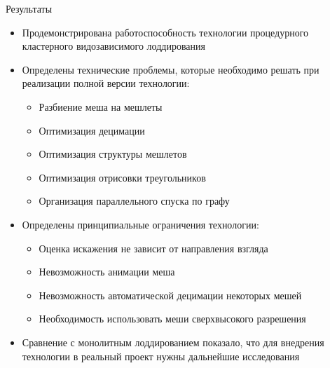 \begin{frame}{Результаты}
    \begin{itemize}
        \item Продемонстрирована работоспособность технологии процедурного кластерного видозависимого лоддирования
        \item Определены технические проблемы, которые необходимо решать при реализации полной версии технологии:
        \begin{itemize}
            \item Разбиение меша на мешлеты
            \item Оптимизация децимации
            \item Оптимизация структуры мешлетов
            \item Оптимизация отрисовки треугольников
            \item Организация параллельного спуска по графу
        \end{itemize}
        \item Определены принципиальные ограничения технологии:
        \begin{itemize}
            \item Оценка искажения не зависит от направления взгляда
            \item Невозможность анимации меша
            \item Невозможность автоматической децимации некоторых мешей
            \item Необходимость использовать меши сверхвысокого разрешения
        \end{itemize}
        \item Сравнение с монолитным лоддированием показало, что для внедрения технологии в реальный проект нужны дальнейшие исследования
    \end{itemize}
\end{frame}
